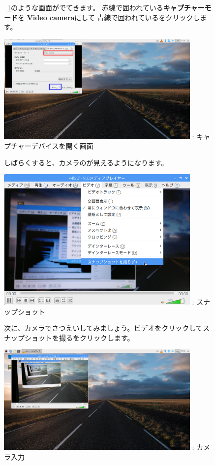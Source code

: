 \documentclass[a4paper,12pt]{jarticle}
\begin{document}
\begin{figure}[ht]
  ~\ref{seq:refFigure23}のような画面がでてきます。
  赤線で囲われている\textbf{キャプチャーモード}を
  \textbf{Video camera}にして
  青線で囲われている\textbf{}をクリックします。


  \centering
  \begin{minipage}{10cm}
    \includegraphics[width=10cm]{textbook-img117.png}
    {\theFigure\label{seq:refFigure23}}:
    キャプチャーデバイスを開く画面
  \end{minipage}

  \flushleft
  しばらくすると、カメラのが見えるようになります。

  \centering
  \begin{minipage}{10cm}
    {\upshape
      \includegraphics[width=10cm]{textbook-img118.png}
      \newline
      : スナップショット}
  \end{minipage}
  \flushleft

  次に、カメラでさつえいしてみましょう。ビデオをクリックしてスナップショットを撮るをクリックします。


  \centering
  \begin{minipage}{10cm}
    \includegraphics[width=10cm]{textbook-img119.png}
    {\upshape
      : カメラ入力}
  \end{minipage}
\end{figure}
\end{document}
